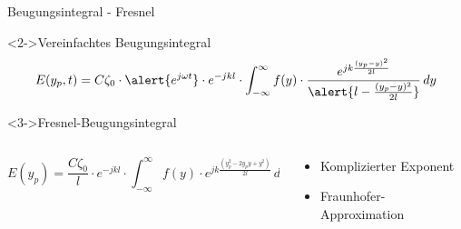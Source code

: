 \begin{frame}{Beugungsintegral - Fresnel}
    \begin{block}<2->{Vereinfachtes Beugungsintegral}
        \begin{equation*}
            E(y_p, t)
            =
            C\zeta_0 \cdot \alert{e^{j\omega t}} \cdot e^{-jkl} \cdot \int_{-\infty}^{\infty}f(y)\cdot\frac{e^{jk\frac{(y_p-y)^2}{2l}}}{\alert{l - \frac{(y_p-y)^2}{2l}}} \,dy
        \end{equation*}
    \end{block}
    \begin{exampleblock}<3->{Fresnel-Beugungsintegral}
        \begin{columns}
            \begin{column}{0.6\textwidth}
                \vspace*{\baselineskip}
                \begin{equation*}
                    E(y_p)
                    =
                    \frac{C\zeta_0}{l} \cdot e^{-jkl} \cdot \int_{-\infty}^{\infty}f(y)\cdot e^{jk\frac{(y_p^2 - 2y_py + y^2)}{2l}} \,dy
                \end{equation*}
                \vspace*{0.2\baselineskip}
            \end{column}
            \begin{column}{0.4\textwidth}
                \begin{itemize}
                    \item<4-> Komplizierter Exponent
                    \item<4-> Fraunhofer-Approximation
                \end{itemize}
            \end{column}
        \end{columns}
    \end{exampleblock}
\end{frame}


